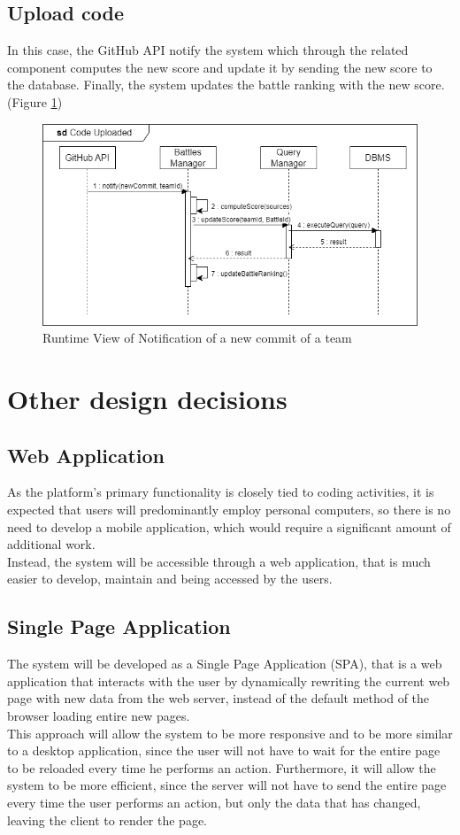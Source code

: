 \subsection{Upload code}
In this case, the GitHub API notify the system which through the related component computes the new score and update it by sending the new score to the database. Finally, the system updates the battle ranking with the new score. (Figure \ref{fig:RuntimeView_CodeUploaded})
\begin{figure}[H]
    \centering
    \includegraphics[width=\textwidth]{images/runtimeviews/RuntimeView_CodeUploaded.png}
    \caption{Runtime View of Notification of a new commit of a team}
    \label{fig:RuntimeView_CodeUploaded}
\end{figure}

\section{Other design decisions}
\subsection{Web Application}
As the platform's primary functionality is closely tied to coding activities, it is expected that users will predominantly employ personal computers, so there is no need to develop a mobile application, which would require a significant amount of additional work.\\
Instead, the system will be accessible through a web application, that is much easier to develop, maintain and being accessed by the users.

\subsection{Single Page Application}
The system will be developed as a Single Page Application (SPA), that is a web application that interacts with the user by dynamically rewriting the current web page with new data from the web server, instead of the default method of the browser loading entire new pages.\\
This approach will allow the system to be more responsive and to be more similar to a desktop application, since the user will not have to wait for the entire page to be reloaded every time he performs an action. Furthermore, it will allow the system to be more efficient, since the server will not have to send the entire page every time the user performs an action, but only the data that has changed, leaving the client to render the page.

